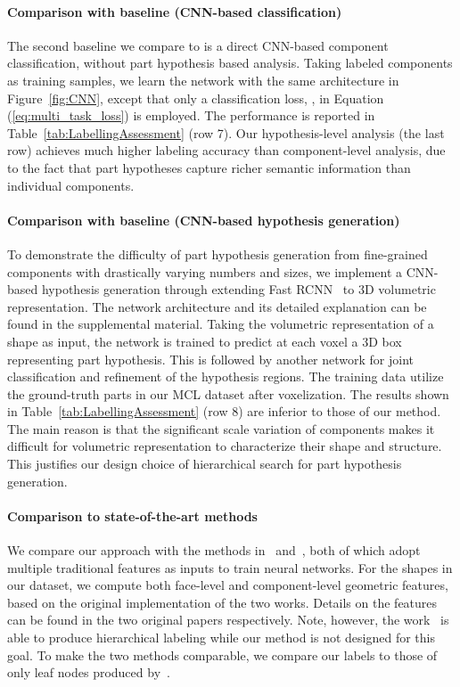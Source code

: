 \documentclass[acmtog]{acmart}
\newcommand{\kx}[1]{{\color{black}#1}}
\begin{document}
{\paragraph{\textbf{Comparison with baseline (CNN-based classification)}}
The second baseline we compare to is a direct CNN-based component classification, without
part hypothesis based analysis.
Taking labeled components as training samples,
we learn the network with the same architecture in Figure~\ref{fig:CNN},
except that only a classification loss, , in Equation (\ref{eq:multi_task_loss}) is employed.
The performance is reported in Table~\ref{tab:LabellingAssessment} (row 7).
Our hypothesis-level analysis (the last row) achieves much higher
labeling accuracy than component-level analysis, due to the fact that part hypotheses
capture richer semantic information than individual components.


\paragraph{\textbf{Comparison with baseline (CNN-based hypothesis generation)}}
\label{subsec:base}
\kx{
To demonstrate the difficulty of part hypothesis generation from fine-grained components with drastically varying numbers and sizes, we implement a CNN-based hypothesis generation through extending Fast RCNN~\cite{girshick2015} to 3D volumetric representation.
The network architecture and its detailed explanation can be found in the supplemental material.
Taking the volumetric representation of a shape as input, the network is trained to predict at each voxel
a 3D box representing part hypothesis.
This is followed by another network for joint classification and refinement of the hypothesis regions.
The training data utilize the ground-truth parts in our MCL dataset after voxelization.
The results shown in Table~\ref{tab:LabellingAssessment} (row 8) are inferior to those of our method.
The main reason is that the significant scale variation of components makes it difficult for volumetric representation to characterize their shape and structure. This justifies our design choice of hierarchical search for part hypothesis generation.





}

\paragraph{\textbf{Comparison to state-of-the-art methods}}
We compare our approach with the methods in~\citep{Yi_SG17} and~\cite{Guo_TOG15},
both of which adopt multiple traditional features as inputs to train neural networks.
For the shapes in our dataset,
we compute both face-level and component-level geometric features, based on the original implementation
of the two works.
Details on the features can be found in the two original papers respectively.
Note, however, the work~\citep{Yi_SG17} is able to produce hierarchical labeling while our method
is not designed for this goal.
To make the two methods comparable, we compare our labels to those of only leaf nodes produced by~\citep{Yi_SG17}.

}
\end{document}
